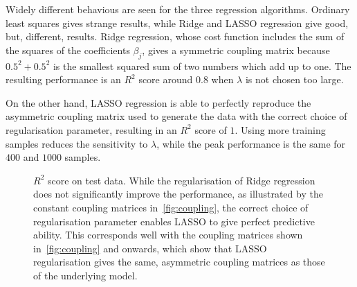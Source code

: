\documentclass[11pt,british,a4paper]{article}
\numberwithin{equation}{section}
\begin{document}
Widely different behavious are seen for the three regression algorithms.
Ordinary least squares gives strange results, while Ridge and LASSO regression give good, but, different, results.
Ridge regression, whose cost function includes the sum of the squares of the coefficients \(\beta_j\), gives a symmetric coupling matrix because \(\num{0.5}^2+\num{0.5}^2\) is the smallest squared sum of two numbers which add up to one.
The resulting performance is an \(R^2\) score around \(\num{0.8}\) when \(\lambda\) is not chosen too large.

On the other hand, LASSO regression is able to perfectly reproduce the asymmetric coupling matrix used to generate the data with the correct choice of regularisation parameter, resulting in an \(R^2\) score of \(1\). Using more training samples reduces the sensitivity to \(\lambda\), while the peak performance is the same for \(\num{400}\) and \(\num{1000}\) samples.

\begin{figure}[H]
    \centering
    \caption{\(R^2\) score on test data. While the regularisation of Ridge regression does not significantly improve the performance, as illustrated by the constant coupling matrices in~\vref{fig:coupling}, the correct choice of regularisation parameter enables LASSO to give perfect predictive ability. This corresponds well with the coupling matrices shown in~\ref{fig:coupling} and onwards, which show that LASSO regularisation gives the same, asymmetric coupling matrices as those of the underlying model.}\label{fig:r2}
\end{figure}
\end{document}
